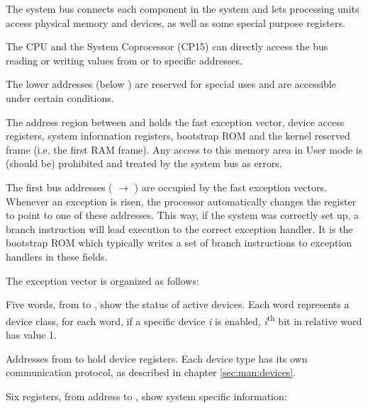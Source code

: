 
The system bus connects each component in the system and lets processing units access physical memory and devices, as well as some special purpose registers.

The CPU and the System Coprocessor (CP15) can directly access the bus reading or writing values from or to specific addresses.

The lower addresses (below ) are reserved for special uses and are accessible under certain conditions.

\label{sec:man:reservedAddressSpace}
The address region between  and  holds the fast exception vector, device access registers, system information registers, bootstrap ROM and the kernel reserved frame (i.e. the first RAM frame). Any access to this memory area in User mode is (should be) prohibited and treated by the system bus as errors.


\label{sec:man:exceptionVector}
The first bus addresses ( $\rightarrow$ ) are occupied by the fast exception vectors.
Whenever an exception is risen, the processor automatically changes the  register to point to one of these addresses. 
This way, if the system was correctly set up, a branch instruction will lead execution to the correct exception handler.
It is the bootstrap ROM which typically writes a set of branch instructions to exception handlers in these fields.

The exception vector is organized as follows:


Five words, from  to , show the status of active devices. Each word represents a device class, for each word, if a specific device \emph{i} is enabled, \emph{i}\textsuperscript{th} bit in relative word has value 1.


Addresses from  to  hold device registers.
Each device type has its own communication protocol, as described in chapter \ref{sec:man:devices}.

Six registers, from address  to , show system specific information:

